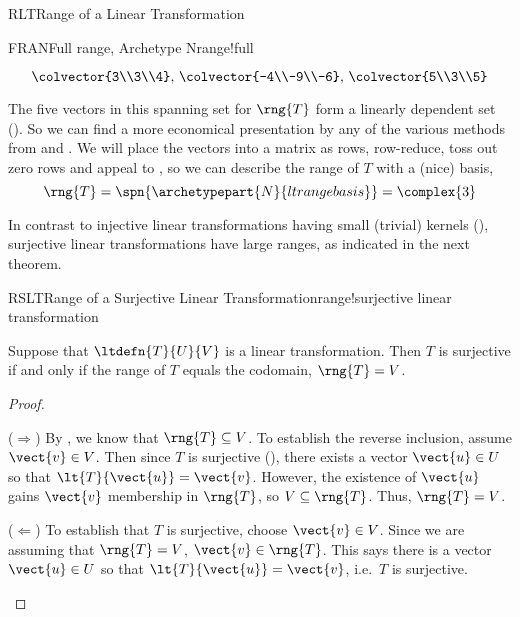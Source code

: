 \begin{subsect}{RLT}{Range of a Linear Transformation}
\begin{example}{FRAN}{Full range, Archetype N}{range!full}
\begin{para}
\begin{equation*}
{{\colvector{3\\3\\4},\,
\colvector{-4\\-9\\-6},\,
\colvector{5\\3\\5}
}}
\end{equation*}
\end{para}
%
\begin{para}The five vectors in this spanning set for $\rng{T}$ form a linearly dependent set ().  So we can find a more economical presentation by any of the various methods from  and .  We will place the vectors into a matrix as rows, row-reduce, toss out zero rows and appeal to , so we can describe the range of $T$ with a (nice) basis,
%
\begin{equation*}
\rng{T}=\spn{\archetypepart{N}{ltrangebasis}}=\complex{3}\end{equation*}
\end{para}
%
\end{example}
%
\begin{para}In contrast to injective linear transformations having small (trivial) kernels (), surjective linear transformations have large ranges, as indicated in the next theorem.\end{para}
%
\begin{theorem}{RSLT}{Range of a Surjective Linear Transformation}{range!surjective linear transformation}
\begin{para}Suppose that $\ltdefn{T}{U}{V}$ is a linear transformation.  Then $T$ is surjective if and only if the range of $T$ equals the codomain, $\rng{T}=V$.\end{para}
\end{theorem}
%
\begin{proof}
\begin{para}($\Rightarrow$) By , we know that $\rng{T}\subseteq V$.  To establish the reverse inclusion, assume $\vect{v}\in V$.  Then since $T$ is surjective (), there exists a vector $\vect{u}\in U$ so that $\lt{T}{\vect{u}}=\vect{v}$.  However, the existence of $\vect{u}$ gains $\vect{v}$ membership in $\rng{T}$, so $V\subseteq\rng{T}$.  Thus, $\rng{T}=V$.\end{para}
%
\begin{para}($\Leftarrow$)  To establish that $T$ is surjective, choose $\vect{v}\in V$.  Since we are assuming that $\rng{T}=V$, $\vect{v}\in\rng{T}$.  This says there is a vector $\vect{u}\in U$ so that $\lt{T}{\vect{u}}=\vect{v}$, i.e.\ $T$ is surjective.\end{para}

\end{proof}
\end{subsect}
